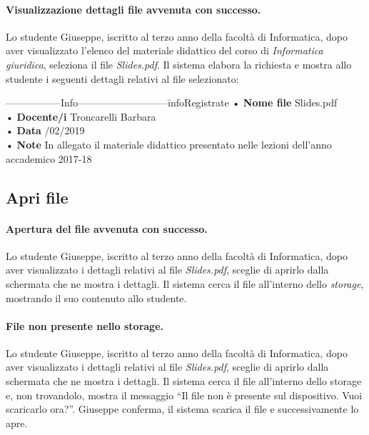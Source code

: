 \paragraph{Visualizzazione dettagli file avvenuta con successo.}
Lo studente Giuseppe, iscritto al terzo anno della facoltà di Informatica, dopo aver visualizzato l’elenco del materiale didattico del corso di \textit{Informatica giuridica}, seleziona il file \textit{Slides.pdf}. Il sistema elabora la richiesta e mostra allo studente i seguenti dettagli relativi al file selezionato:

\begin{tabbing}
	\hspace{1cm}-----------------Info---------------------------\= infoRegistrate\kill
	\hspace{1cm} • \textbf{Nome file} \> Slides.pdf  \\
	\hspace{1cm} • \textbf{Docente/i} \> Troncarelli Barbara  \\
	\hspace{1cm} • \textbf{Data} /02/2019  \\
	\hspace{1cm} • \textbf{Note} \> In allegato il materiale didattico presentato nelle lezioni dell'anno accademico 2017-18  \\
\end{tabbing} 

\subsection{ Apri file}
\paragraph{Apertura del file avvenuta con successo.}
Lo studente Giuseppe, iscritto al terzo anno della facoltà di Informatica, dopo aver visualizzato i dettagli relativi al file \textit{Slides.pdf}, sceglie di aprirlo dalla schermata che ne mostra i dettagli. Il sistema cerca il file all'interno dello \textit{storage}, mostrando il suo contenuto allo studente.

\paragraph{File non presente nello \textbf{storage}.}
Lo studente Giuseppe, iscritto al terzo anno della facoltà di Informatica, dopo aver visualizzato i dettagli relativi al file \textit{Slides.pdf}, sceglie di aprirlo dalla schermata che ne mostra i dettagli. Il sistema cerca il file all'interno dello storage e, non trovandolo, mostra il messaggio “Il file non è presente sul dispositivo. Vuoi scaricarlo ora?”. Giuseppe conferma, il sistema scarica il file e successivamente lo apre.

